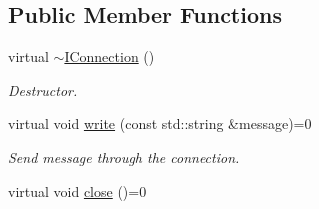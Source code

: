 \subsection*{Public Member Functions}
\begin{DoxyCompactItemize}
\item 
\hypertarget{class_i_connection_a226d9b2460b0230a30216396610cb905}{virtual \hyperlink{class_i_connection_a226d9b2460b0230a30216396610cb905}{$\sim$\-I\-Connection} ()}\label{class_i_connection_a226d9b2460b0230a30216396610cb905}

\begin{DoxyCompactList}\small\item\em Destructor. \end{DoxyCompactList}\item 
virtual void \hyperlink{class_i_connection_a1099dbaffac0d95c3bd7ff1ed774b272}{write} (const std\-::string \&message)=0
\begin{DoxyCompactList}\small\item\em Send message through the connection. \end{DoxyCompactList}\item 
\hypertarget{class_i_connection_a9db08e54eac52b9c5eee34d1c7020b03}{virtual void \hyperlink{class_i_connection_a9db08e54eac52b9c5eee34d1c7020b03}{close} ()=0}\label{class_i_connection_a9db08e54eac52b9c5eee34d1c7020b03}


\end{DoxyCompactItemize}
